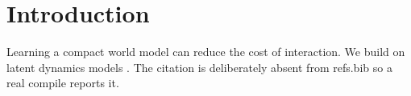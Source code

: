 \section{Introduction}
Learning a compact world model can reduce the cost of interaction.
We build on latent dynamics models \cite{ha2018world}.
The citation is deliberately absent from refs.bib so a real compile reports it.
